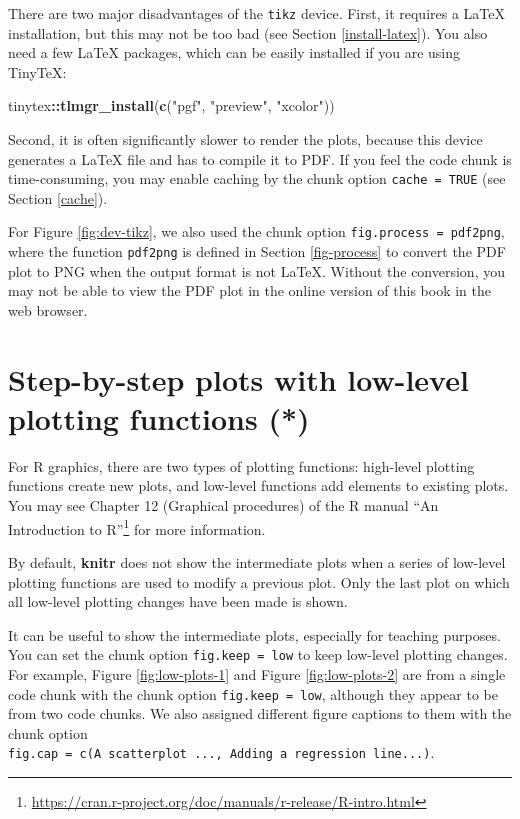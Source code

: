 \documentclass[
  11pt,
]{krantz}
\newenvironment{Shaded}{\begin{snugshade}}{\end{snugshade}}
\newcommand{\KeywordTok}[1]{\textcolor[rgb]{0.27,0.27,0.27}{\textbf{#1}}}
\newcommand{\NormalTok}[1]{#1}
\newcommand{\OperatorTok}[1]{\textcolor[rgb]{0.43,0.43,0.43}{\textbf{#1}}}
\newcommand{\StringTok}[1]{\textcolor[rgb]{0.5,0.5,0.5}{#1}}
\renewcommand{\href}[2]{#2\footnote{\url{#1}}}
\begin{document}
There are two major disadvantages of the \texttt{tikz} device. First, it requires a LaTeX installation, but this may not be too bad (see Section \ref{install-latex}). You also need a few LaTeX packages, which can be easily installed if you are using TinyTeX:

\begin{Shaded}
\begin{Highlighting}[]
\NormalTok{tinytex}\OperatorTok{::}\KeywordTok{tlmgr_install}\NormalTok{(}\KeywordTok{c}\NormalTok{(}\StringTok{"pgf"}\NormalTok{, }\StringTok{"preview"}\NormalTok{, }\StringTok{"xcolor"}\NormalTok{))}
\end{Highlighting}
\end{Shaded}

Second, it is often significantly slower to render the plots, because this device generates a LaTeX file and has to compile it to PDF. If you feel the code chunk is time-consuming, you may enable caching by the chunk option \texttt{cache\ =\ TRUE} (see Section \ref{cache}).

For Figure \ref{fig:dev-tikz}, we also used the chunk option \texttt{fig.process\ =\ pdf2png}, where the function \texttt{pdf2png} is defined in Section \ref{fig-process} to convert the PDF plot to PNG when the output format is not LaTeX. Without the conversion, you may not be able to view the PDF plot in the online version of this book in the web browser.

\hypertarget{low-plots}{%
\section{Step-by-step plots with low-level plotting functions (*)}\label{low-plots}}

For R graphics, there are two types of plotting functions: high-level plotting functions create new plots, and low-level functions add elements to existing plots. You may see Chapter 12 (Graphical procedures) of the R manual \href{https://cran.r-project.org/doc/manuals/r-release/R-intro.html}{``An Introduction to R''} for more information.

By default, \textbf{knitr} does not show the intermediate plots when a series of low-level plotting functions are used to modify a previous plot. Only the last plot on which all low-level plotting changes have been made is shown.

It can be useful to show the intermediate plots, especially for teaching purposes. You can set the chunk option \texttt{fig.keep\ =\ \textquotesingle{}low\textquotesingle{}} to keep low-level plotting changes. For example, Figure \ref{fig:low-plots-1} and Figure \ref{fig:low-plots-2} are from a single code chunk with the chunk option \texttt{fig.keep\ =\ \textquotesingle{}low\textquotesingle{}}, although they appear to be from two code chunks. We also assigned different figure captions to them with the chunk option \texttt{fig.cap\ =\ c(\textquotesingle{}A\ scatterplot\ ...\textquotesingle{},\ \textquotesingle{}Adding\ a\ regression\ line...\textquotesingle{})}.
\end{document}
